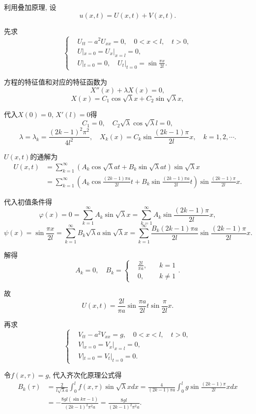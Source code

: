 \documentclass[11pt,a4paper]{article}
\begin{document}
利用叠加原理, 设$$u(x,t)=U(x,t)+V(x,t).$$

先求
$$
  \left\{\begin{aligned}
     & U_{tt}-a^2U_{xx}=0, \quad 0<x<l,\quad t>0,        \\
     & U|_{x=0}=U_x|_{x=l}=0,                            \\
     & U|_{t=0}=0,\quad U_t|_{t=0}=\sin\frac{\pi x}{2l}.
  \end{aligned}\right.
$$

方程的特征值和对应的特征函数为
$$X''(x)+\lambda X(x)=0,$$
$$X(x)=C_1\cos\sqrt{\lambda}x+C_2\sin\sqrt{\lambda}x,$$

代入$X(0)=0$, $X'(l)=0$得
$$C_1=0,\quad C_2\sqrt{\lambda}\cos\sqrt{\lambda}l=0,$$
$$\lambda=\lambda_k=\frac{(2k-1)^2\pi^2}{4l^2},\quad X_k(x)=C_k\sin\frac{(2k-1)\pi}{2l}x,\quad k=1,2,\cdots.$$

$U(x,t)$的通解为
\begin{align*}
  U(x,t)
   & =\sum_{k=1}^\infty\left(A_k\cos\sqrt{\lambda}at+
  B_k\sin\sqrt{\lambda}at\right)\sin\sqrt{\lambda}x          \\
   & =\sum_{k=1}^\infty\left(A_k\cos\frac{(2k-1)\pi a}{2l}t+
  B_k\sin\frac{(2k-1)\pi a}{2l}t\right)\sin\frac{(2k-1)\pi}{2l}x.
\end{align*}

代入初值条件得
$$\varphi(x)=0=\sum_{k=1}^\infty A_k\sin\sqrt{\lambda}x=\sum_{k=1}^\infty A_k\sin\frac{(2k-1)\pi }{2l}x,$$
$$\psi(x)=\sin\frac{\pi x}{2l}=\sum_{k=1}^\infty B_k\sqrt{\lambda}a\sin\sqrt{\lambda}x=\sum_{k=1}^\infty \frac{B_k(2k-1)\pi a}{2l}\sin\frac{(2k-1)\pi}{2l}x.$$

解得
$$A_k=0,\quad B_k=\left\{\begin{aligned}&\frac{2l}{\pi a}, &\quad k = 1 \\& 0, &\quad k\neq 1 \end{aligned}\right..$$

故
$$U(x,t)=\frac{2l}{\pi a}\sin\frac{\pi a}{2l}t\sin\frac{\pi}{2l}x.$$

再求
$$
  \left\{\begin{aligned}
     & V_{tt}-a^2V_{xx}=g, \quad 0<x<l,\quad t>0, \\
     & V|_{x=0}=V_x|_{x=l}=0,                     \\
     & V|_{t=0}=V_t|_{t=0}=0.
  \end{aligned}\right.
$$

令$f(x,\tau)=g$, 代入齐次化原理公式得
\begin{align*}
  B_k(\tau)
   & =\frac{2}{l\sqrt{\lambda}a}\int_0^lf(x,\tau)\sin\sqrt{\lambda}xdx=\frac{4}{(2k-1)\pi a}\int_0^lg\sin\frac{(2k-1)\pi}{2l}xdx \\
   & =-\frac{8gl(\sin k\pi -1)}{(2k-1)^2\pi^2a}=\frac{8gl}{(2k-1)^2\pi^2a}.
\end{align*}
\end{document}
